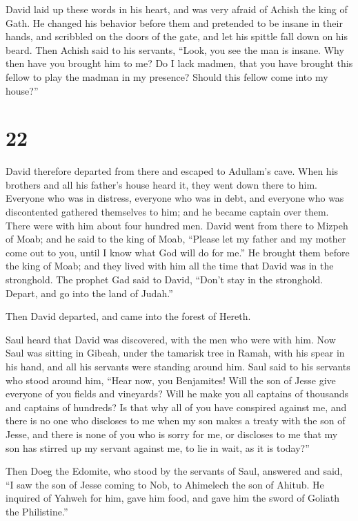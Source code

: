  David laid up these words in his heart, and was very
afraid of Achish the king of Gath.  He changed his behavior
before them and pretended to be insane in their hands, and scribbled on
the doors of the gate, and let his spittle fall down on his beard.
 Then Achish said to his servants, ``Look, you see the man
is insane. Why then have you brought him to me?  Do I lack
madmen, that you have brought this fellow to play the madman in my
presence? Should this fellow come into my house?''

\hypertarget{section-21}{%
\section{22}\label{section-21}}

 David therefore departed from there and escaped to
Adullam's cave. When his brothers and all his father's house heard it,
they went down there to him.  Everyone who was in distress,
everyone who was in debt, and everyone who was discontented gathered
themselves to him; and he became captain over them. There were with him
about four hundred men.  David went from there to Mizpeh of
Moab; and he said to the king of Moab, ``Please let my father and my
mother come out to you, until I know what God will do for me.''
 He brought them before the king of Moab; and they lived
with him all the time that David was in the stronghold.  The
prophet Gad said to David, ``Don't stay in the stronghold. Depart, and
go into the land of Judah.''

Then David departed, and came into the forest of Hereth.

 Saul heard that David was discovered, with the men who were
with him. Now Saul was sitting in Gibeah, under the tamarisk tree in
Ramah, with his spear in his hand, and all his servants were standing
around him.  Saul said to his servants who stood around him,
``Hear now, you Benjamites! Will the son of Jesse give everyone of you
fields and vineyards? Will he make you all captains of thousands and
captains of hundreds?  Is that why all of you have conspired
against me, and there is no one who discloses to me when my son makes a
treaty with the son of Jesse, and there is none of you who is sorry for
me, or discloses to me that my son has stirred up my servant against me,
to lie in wait, as it is today?''

 Then Doeg the Edomite, who stood by the servants of Saul,
answered and said, ``I saw the son of Jesse coming to Nob, to Ahimelech
the son of Ahitub.  He inquired of Yahweh for him, gave him
food, and gave him the sword of Goliath the Philistine.''

